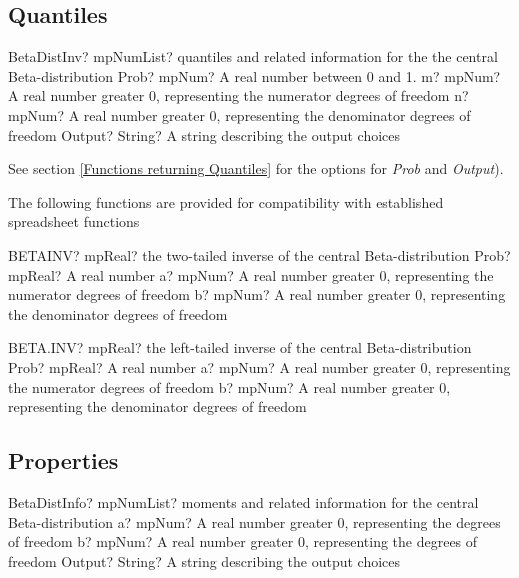 \subsection{Quantiles}

\begin{mpFunctionsExtract}
	\mpFunctionFourNotImplemented
	{BetaDistInv? mpNumList? quantiles and related information for the the central Beta-distribution}
	{Prob? mpNum? A real number between 0 and 1.}
	{m? mpNum? A real number greater 0, representing the numerator  degrees of freedom}
	{n? mpNum? A real number greater 0, representing the denominator degrees of freedom}
	{Output? String? A string describing the output choices}
\end{mpFunctionsExtract}

See section \ref{Functions returning Quantiles} for the options for  {\itshape\sffamily Prob} and {\itshape\sffamily Output}). 

\vspace{0.3cm}

The following functions are provided for compatibility with established spreadsheet functions

\vspace{0.3cm}
\begin{mpFunctionsExtract}
	\mpWorksheetFunctionThree
	{BETAINV? mpReal? the two-tailed inverse of the central Beta-distribution}
	{Prob? mpReal? A real number}
	{a? mpNum? A real number greater 0, representing the numerator  degrees of freedom}
	{b? mpNum? A real number greater 0, representing the denominator degrees of freedom}
\end{mpFunctionsExtract}

\vspace{0.6cm}
\begin{mpFunctionsExtract}
	\mpWorksheetFunctionThree
	{BETA.INV? mpReal? the left-tailed inverse of the central Beta-distribution}
	{Prob? mpReal? A real number}
	{a? mpNum? A real number greater 0, representing the numerator  degrees of freedom}
	{b? mpNum? A real number greater 0, representing the denominator degrees of freedom}
\end{mpFunctionsExtract}


\subsection{Properties}
\label{BetaDistributionProperties}


\begin{mpFunctionsExtract}
	\mpFunctionThreeNotImplemented
	{BetaDistInfo? mpNumList? moments and related information for the central Beta-distribution}
	{a? mpNum? A real number greater 0, representing the degrees of freedom}
	{b? mpNum? A real number greater 0, representing the degrees of freedom}
	{Output? String? A string describing the output choices}
\end{mpFunctionsExtract}

